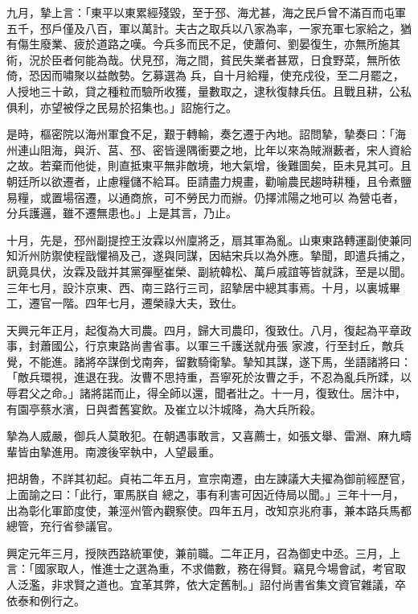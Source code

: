 \begin{pinyinscope}
 九月，摯上言：「東平以東累經殘毀，至于邳、海尤甚，海之民戶曾不滿百而屯軍五千，邳戶僅及八百，軍以萬計。夫古之取兵以八家為率，一家充軍七家給之，猶有傷生廢業、疲於道路之嘆。今兵多而民不足，使蕭何、劉晏復生，亦無所施其術，況於臣者何能為哉。伏見邳，海之間，貧民失業者甚眾，日食野菜，無所依倚，恐因而嘯聚以益敵勢。乞募選為
 兵，自十月給糧，使充戍役，至二月罷之，人授地三十畝，貸之種粒而驗所收獲，量數取之，逮秋復隸兵伍。且戰且耕，公私俱利，亦望被俘之民易於招集也。」詔施行之。



 是時，樞密院以海州軍食不足，艱于轉輸，奏乞遷于內地。詔問摯，摯奏曰：「海州連山阻海，與沂、莒、邳、密皆邊隅衝要之地，比年以來為賊淵藪者，宋人資給之故。若棄而他徙，則直抵東平無非敵境，地大氣增，後難圖矣，臣未見其可。且朝廷所以欲遷者，止慮糧儲不給耳。臣請盡力規畫，勸喻農民趨時耕種，且令煮鹽易糧，或置場宿遷，以通商旅，可不勞民力而辦。仍擇沭陽之地可以
 為營屯者，分兵護邏，雖不遷無患也。」上是其言，乃止。



 十月，先是，邳州副提控王汝霖以州廩將乏，扇其軍為亂。山東東路轉運副使兼同知沂州防禦使程戩懼禍及己，遂與同謀，因結宋兵以為外應。摯聞，即遣兵捕之，訊竟具伏，汝霖及戩并其黨彈壓崔榮、副統韓松、萬戶戚誼等皆就誅，至是以聞。三年七月，設汴京東、西、南三路行三司，詔摯居中總其事焉。十月，以裏城畢工，遷官一階。四年七月，遷榮祿大夫，致仕。



 天興元年正月，起復為大司農。四月，歸大司農印，復致仕。八月，復起為平章政事，封蕭國公，行京東路尚書省事。以軍三千護送就舟張
 家渡，行至封丘，敵兵覺，不能進。諸將卒謀倒戈南奔，留數騎衛摯。摯知其謀，遂下馬，坐語諸將曰：「敵兵環視，進退在我。汝曹不思持重，吾寧死於汝曹之手，不忍為亂兵所蹂，以辱君父之命。」諸將諾而止，得全師以還，聞者壯之。十一月，復致仕。居汴中，有園亭蔡水濱，日與耆舊宴飲。及崔立以汴城降，為大兵所殺。



 摯為人威嚴，御兵人莫敢犯。在朝遇事敢言，又喜薦士，如張文舉、雷淵、麻九疇輩皆由摯進用。南渡後宰執中，人望最重。



 把胡魯，不詳其初起。貞祐二年五月，宣宗南遷，由左諫議大夫擢為御前經歷官，上面諭之曰：「此行，軍馬朕自
 總之，事有利害可因近侍局以聞。」三年十一月，出為彰化軍節度使，兼涇州管內觀察使。四年五月，改知京兆府事，兼本路兵馬都總管，充行省參議官。



 興定元年三月，授陜西路統軍使，兼前職。二年正月，召為御史中丞。三月，上言：「國家取人，惟進士之選為重，不求備數，務在得賢。竊見今場會試，考官取人泛濫，非求賢之道也。宜革其弊，依大定舊制。」詔付尚書省集文資官雜議，卒依泰和例行之。




\end{pinyinscope}

